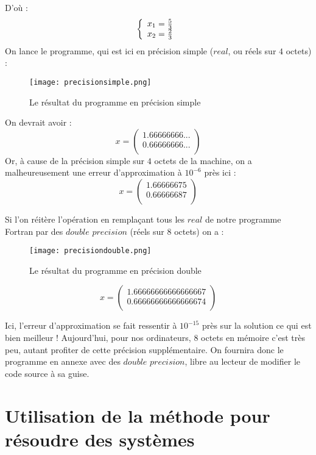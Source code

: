 \documentclass[a4paper, titlepage]{livret}													%
\begin{document}
		D'où :
			\[
				\left\{
				\begin{array}{ll}
					x_{1} = \frac{5}{3} \\
					x_{2} = \frac{2}{3} \\
				\end{array} \right. \\
			\]
		On lance le programme, qui est ici en précision simple ($real$, ou \og réels \fg{} sur $4$ octets) :
		\begin{figure}[!ht]
			\centering
  				\texttt{[image: precisionsimple.png]}
  				\caption{Le résultat du programme en précision simple}
		\end{figure}

		On devrait avoir :
		\[
			x = 
			\begin{pmatrix}
				1.66666666... \\
				0.66666666... \\
			\end{pmatrix}
		\]
		Or, à cause de la précision simple sur $4$ octets de la machine, on a malheureusement une erreur d'approximation à $10^{-6}$ près ici :
		\[
			x = 
			\begin{pmatrix}
				1.66666675 \\
				0.66666687 \\
			\end{pmatrix}
		\]

		Si l'on réitère l'opération en remplaçant tous les $real$ de notre programme Fortran par des $double$ $precision$ (\og réels \fg{} sur $8$ octets) on a :
		\begin{figure}[!ht]
			\centering
  				\texttt{[image: precisiondouble.png]}
  				\caption{Le résultat du programme en précision double}
		\end{figure}
		\[
			x = 
			\begin{pmatrix}
				1.66666666666666667 \\
				0.66666666666666674 \\
			\end{pmatrix}
		\]

		Ici, l'erreur d'approximation se fait ressentir à $10^{-15}$ près sur la solution ce qui est bien meilleur ! Aujourd'hui, pour nos ordinateurs, $8$ octets en mémoire c'est très peu, autant profiter de cette précision supplémentaire.
		On fournira donc le programme en annexe avec des $double$ $precision$, libre au lecteur de modifier le code source à sa guise.

	
\chapter{Utilisation de la méthode pour résoudre des systèmes}
\end{document}
